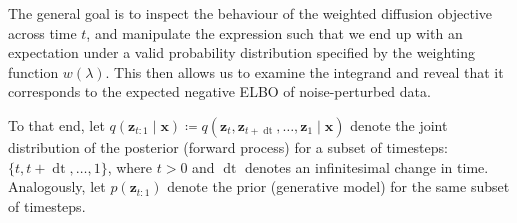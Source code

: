 The general goal is to inspect the behaviour of the weighted diffusion objective across time $t$, and manipulate the expression such that we end up with an expectation under a valid probability distribution specified by the weighting function $w(\lambda)$. This then allows us to examine the integrand and reveal that it corresponds to the expected negative ELBO of noise-perturbed data.

To that end, let $q(\mathbf{z}_{t:1} \mid \mathbf{x}) \coloneqq q(\mathbf{z}_{t},\mathbf{z}_{t + \mathop{\mathrm{d}t}},\dots,\mathbf{z}_{1} \mid \mathbf{x})$ denote the joint distribution of the posterior (forward process) for a subset of timesteps: $\{t,t + \mathop{\mathrm{d}t},\dots,1\}$, where $t > 0$ and $\mathop{\mathrm{d}t}$ denotes an infinitesimal change in time. Analogously, let $p(\mathbf{z}_{t:1})$ denote the prior (generative model) for the same subset of timesteps. 

